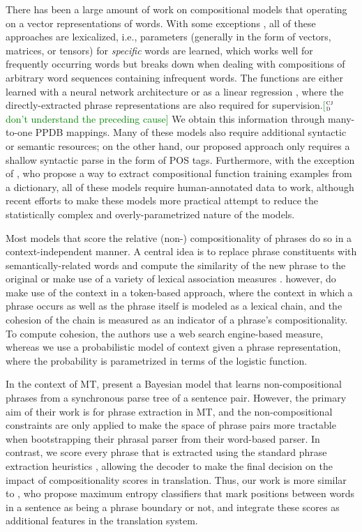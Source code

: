 \documentclass[11pt,letterpaper]{article}
\newcommand{\ensuretext}[1]{#1}
\newcommand{\clabcomment}[3]{\ensuretext{\textcolor{#3}{[#1 #2]}}}
\newcommand{\cjdmarker}{\ensuretext{\textcolor{green}{\ensuremath{^{\textsc{cj}}_{\textsc{d}}}}}}
\newcommand{\cjd}[1]{\clabcomment{\cjdmarker}{#1}{green}}
\begin{document}
There has been a large amount of work on compositional models that operating on a vector representations of words. 
With some exceptions \cite{Mitchell2008,Mitchell2010}, all of these approaches are lexicalized, i.e., parameters (generally in the form of vectors, matrices, or tensors) for \emph{specific} words are learned, which works well for frequently occurring words but breaks down when dealing with compositions of arbitrary word sequences containing infrequent words. 
The functions are either learned with a neural network architecture \cite[\emph{inter alia}]{Socher2013} or as a linear regression \cite{Baroni2010,Zanzotto2010}, where the directly-extracted phrase representations are also required for supervision.\cjd{don't understand the preceding cause}
We obtain this information through many-to-one PPDB mappings. 
Many of these models also require additional syntactic \cite{Socher2012} or semantic \cite{Hermann2013,Grefenstette2013} resources; on the other hand, our proposed approach only requires a shallow syntactic parse in the form of POS tags. 
Furthermore, with the exception of , who propose a way to extract compositional function training examples from a dictionary, all of these models require human-annotated data to work, although recent efforts to make these models more practical \cite{Paperno2014} attempt to reduce the statistically complex and overly-parametrized nature of the models.  

Most models that score the relative (non-) compositionality of phrases do so in a context-independent manner. 
A central idea is to replace phrase constituents with semantically-related words and compute the similarity of the new phrase to the original \cite{Kiela2013,Salehi2014} or make use of a variety of lexical association measures \cite{Lin1999,Pecina2006}. 
 however, do make use of the context in a token-based approach, where the context in which a phrase occurs as well as the phrase itself is modeled as a lexical chain, and the cohesion of the chain is measured as an indicator of a phrase's compositionality. 
To compute cohesion, the authors use a web search engine-based measure, whereas we use a probabilistic model of context given a phrase representation, where the probability is parametrized in terms of the logistic function.  

In the context of MT,  present a Bayesian model that learns non-compositional phrases from a synchronous parse tree of a sentence pair.
However, the primary aim of their work is for phrase extraction in MT, and the non-compositional constraints are only applied to make the space of phrase pairs more tractable when bootstrapping their phrasal parser from their word-based parser. 
In contrast, we score every phrase that is extracted using the standard phrase extraction heuristics \cite{Chiang2007}, allowing the decoder to make the final decision on the impact of compositionality scores in translation. 
Thus, our work is more similar to , who propose maximum entropy classifiers that mark positions between words in a sentence as being a phrase boundary or not, and integrate these scores as additional features in the translation system.  
\end{document}
